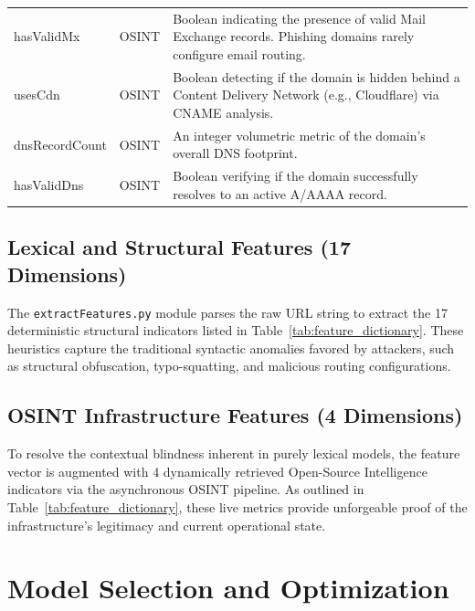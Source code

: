 \begin{longtable}{
>{\raggedright\arraybackslash\ttfamily\scriptsize}p{}
>{\raggedright\arraybackslash\footnotesize}p{}
>{\raggedright\arraybackslash\footnotesize}p{}}
\midrule
\multicolumn{3}{c}{\textbf{OSINT Infrastructure Features (4 Dimensions)}} \\
\midrule
hasValidMx & OSINT & Boolean indicating the presence of valid Mail Exchange records. Phishing domains rarely configure email routing. \\
usesCdn & OSINT & Boolean detecting if the domain is hidden behind a Content Delivery Network (e.g., Cloudflare) via CNAME analysis. \\
dnsRecordCount & OSINT & An integer volumetric metric of the domain's overall DNS footprint. \\
hasValidDns & OSINT & Boolean verifying if the domain successfully resolves to an active A/AAAA record. \\

\end{longtable}

\subsection{Lexical and Structural Features (17
Dimensions)}\label{lexical-and-structural-features-17-dimensions}

The \texttt{extractFeatures.py} module parses the raw URL string to
extract the 17 deterministic structural indicators listed in Table~\ref{tab:feature_dictionary}. These heuristics capture
the traditional syntactic anomalies favored by attackers, such as structural obfuscation, typo-squatting, and malicious routing configurations.

\subsection{OSINT Infrastructure Features (4
Dimensions)}\label{osint-infrastructure-features-4-dimensions}

To resolve the contextual blindness inherent in purely lexical models,
the feature vector is augmented with 4 dynamically retrieved Open-Source
Intelligence indicators via the asynchronous OSINT pipeline. As outlined in Table~\ref{tab:feature_dictionary}, these live metrics provide unforgeable proof of the infrastructure's legitimacy and current operational state.

\section{Model Selection and
Optimization}\label{model-selection-and-optimization}

